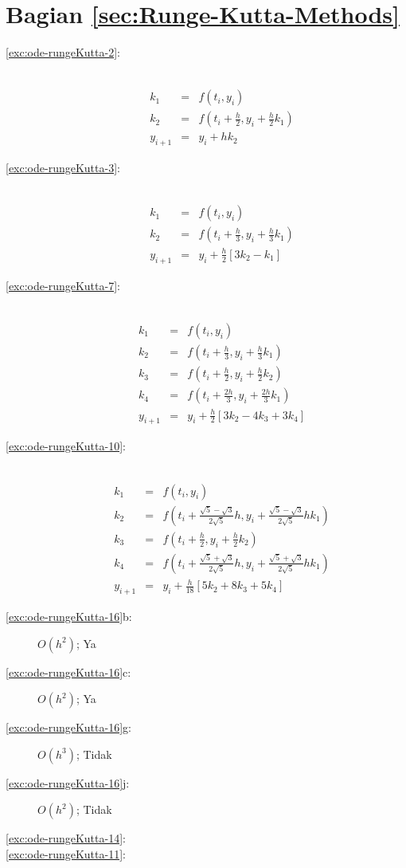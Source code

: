 \section*{Bagian \ref{sec:Runge-Kutta-Methods}}
\begin{description}
\item [{\ref{exc:ode-rungeKutta-2}:}] $\ $
\begin{eqnarray*}
k_{1} & = & f(t_{i},y_{i})\\
k_{2} & = & f\left(t_{i}+\frac{h}{2},y_{i}+\frac{h}{2}k_{1}\right)\\
y_{i+1} & = & y_{i}+hk_{2}
\end{eqnarray*}
\item [{\ref{exc:ode-rungeKutta-3}:}] $\ $
\begin{eqnarray*}
k_{1} & = & f(t_{i},y_{i})\\
k_{2} & = & f\left(t_{i}+\frac{h}{3},y_{i}+\frac{h}{3}k_{1}\right)\\
y_{i+1} & = & y_{i}+\frac{h}{2}\left[3k_{2}-k_{1}\right]
\end{eqnarray*}
\item [{\ref{exc:ode-rungeKutta-7}:}] $\ $
\begin{eqnarray*}
k_{1} & = & f(t_{i},y_{i})\\
k_{2} & = & f\left(t_{i}+\frac{h}{3},y_{i}+\frac{h}{3}k_{1}\right)\\
k_{3} & = & f\left(t_{i}+\frac{h}{2},y_{i}+\frac{h}{2}k_{2}\right)\\
k_{4} & = & f\left(t_{i}+\frac{2h}{3},y_{i}+\frac{2h}{3}k_{1}\right)\\
y_{i+1} & = & y_{i}+\frac{h}{2}\left[3k_{2}-4k_{3}+3k_{4}\right]
\end{eqnarray*}
\item [{\ref{exc:ode-rungeKutta-10}:}] $\ $
\begin{eqnarray*}
k_{1} & = & f(t_{i},y_{i})\\
k_{2} & = & f\left(t_{i}+\frac{\sqrt{5}-\sqrt{3}}{2\sqrt{5}}h,y_{i}+\frac{\sqrt{5}-\sqrt{3}}{2\sqrt{5}}hk_{1}\right)\\
k_{3} & = & f\left(t_{i}+\frac{h}{2},y_{i}+\frac{h}{2}k_{2}\right)\\
k_{4} & = & f\left(t_{i}+\frac{\sqrt{5}+\sqrt{3}}{2\sqrt{5}}h,y_{i}+\frac{\sqrt{5}+\sqrt{3}}{2\sqrt{5}}hk_{1}\right)\\
y_{i+1} & = & y_{i}+\frac{h}{18}\left[5k_{2}+8k_{3}+5k_{4}\right]
\end{eqnarray*}
\item [{\ref{exc:ode-rungeKutta-16}b:}] $O(h^{2})$; Ya
\item [{\ref{exc:ode-rungeKutta-16}c:}] $O(h^{2})$; Ya
\item [{\ref{exc:ode-rungeKutta-16}g:}] $O(h^{3})$; Tidak
\item [{\ref{exc:ode-rungeKutta-16}j:}] $O(h^{2})$; Tidak
\item [{\ref{exc:ode-rungeKutta-14}:}] 
\item [{\ref{exc:ode-rungeKutta-11}:}] $\ $
\end{description}
